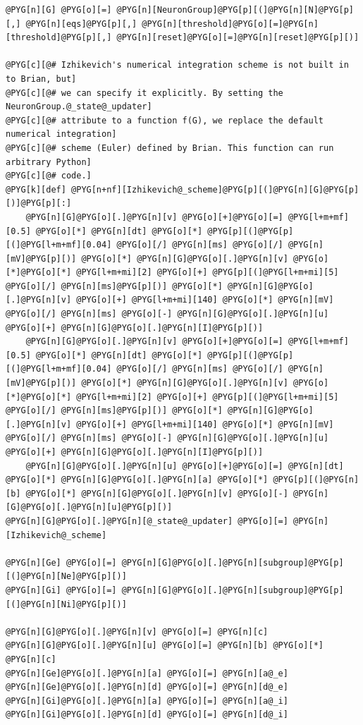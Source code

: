 \documentclass[letterpaper,10pt,english]{manual}
\begin{document}
\begin{Verbatim}[commandchars=@\[\]]
@PYG[n][G] @PYG[o][=] @PYG[n][NeuronGroup]@PYG[p][(]@PYG[n][N]@PYG[p][,] @PYG[n][eqs]@PYG[p][,] @PYG[n][threshold]@PYG[o][=]@PYG[n][threshold]@PYG[p][,] @PYG[n][reset]@PYG[o][=]@PYG[n][reset]@PYG[p][)]

@PYG[c][@# Izhikevich's numerical integration scheme is not built in to Brian, but]
@PYG[c][@# we can specify it explicitly. By setting the NeuronGroup.@_state@_updater]
@PYG[c][@# attribute to a function f(G), we replace the default numerical integration]
@PYG[c][@# scheme (Euler) defined by Brian. This function can run arbitrary Python]
@PYG[c][@# code.]
@PYG[k][def] @PYG[n+nf][Izhikevich@_scheme]@PYG[p][(]@PYG[n][G]@PYG[p][)]@PYG[p][:]
    @PYG[n][G]@PYG[o][.]@PYG[n][v] @PYG[o][+]@PYG[o][=] @PYG[l+m+mf][0.5] @PYG[o][*] @PYG[n][dt] @PYG[o][*] @PYG[p][(]@PYG[p][(]@PYG[l+m+mf][0.04] @PYG[o][/] @PYG[n][ms] @PYG[o][/] @PYG[n][mV]@PYG[p][)] @PYG[o][*] @PYG[n][G]@PYG[o][.]@PYG[n][v] @PYG[o][*]@PYG[o][*] @PYG[l+m+mi][2] @PYG[o][+] @PYG[p][(]@PYG[l+m+mi][5] @PYG[o][/] @PYG[n][ms]@PYG[p][)] @PYG[o][*] @PYG[n][G]@PYG[o][.]@PYG[n][v] @PYG[o][+] @PYG[l+m+mi][140] @PYG[o][*] @PYG[n][mV] @PYG[o][/] @PYG[n][ms] @PYG[o][-] @PYG[n][G]@PYG[o][.]@PYG[n][u] @PYG[o][+] @PYG[n][G]@PYG[o][.]@PYG[n][I]@PYG[p][)]
    @PYG[n][G]@PYG[o][.]@PYG[n][v] @PYG[o][+]@PYG[o][=] @PYG[l+m+mf][0.5] @PYG[o][*] @PYG[n][dt] @PYG[o][*] @PYG[p][(]@PYG[p][(]@PYG[l+m+mf][0.04] @PYG[o][/] @PYG[n][ms] @PYG[o][/] @PYG[n][mV]@PYG[p][)] @PYG[o][*] @PYG[n][G]@PYG[o][.]@PYG[n][v] @PYG[o][*]@PYG[o][*] @PYG[l+m+mi][2] @PYG[o][+] @PYG[p][(]@PYG[l+m+mi][5] @PYG[o][/] @PYG[n][ms]@PYG[p][)] @PYG[o][*] @PYG[n][G]@PYG[o][.]@PYG[n][v] @PYG[o][+] @PYG[l+m+mi][140] @PYG[o][*] @PYG[n][mV] @PYG[o][/] @PYG[n][ms] @PYG[o][-] @PYG[n][G]@PYG[o][.]@PYG[n][u] @PYG[o][+] @PYG[n][G]@PYG[o][.]@PYG[n][I]@PYG[p][)]
    @PYG[n][G]@PYG[o][.]@PYG[n][u] @PYG[o][+]@PYG[o][=] @PYG[n][dt] @PYG[o][*] @PYG[n][G]@PYG[o][.]@PYG[n][a] @PYG[o][*] @PYG[p][(]@PYG[n][b] @PYG[o][*] @PYG[n][G]@PYG[o][.]@PYG[n][v] @PYG[o][-] @PYG[n][G]@PYG[o][.]@PYG[n][u]@PYG[p][)]
@PYG[n][G]@PYG[o][.]@PYG[n][@_state@_updater] @PYG[o][=] @PYG[n][Izhikevich@_scheme]

@PYG[n][Ge] @PYG[o][=] @PYG[n][G]@PYG[o][.]@PYG[n][subgroup]@PYG[p][(]@PYG[n][Ne]@PYG[p][)]
@PYG[n][Gi] @PYG[o][=] @PYG[n][G]@PYG[o][.]@PYG[n][subgroup]@PYG[p][(]@PYG[n][Ni]@PYG[p][)]

@PYG[n][G]@PYG[o][.]@PYG[n][v] @PYG[o][=] @PYG[n][c]
@PYG[n][G]@PYG[o][.]@PYG[n][u] @PYG[o][=] @PYG[n][b] @PYG[o][*] @PYG[n][c]
@PYG[n][Ge]@PYG[o][.]@PYG[n][a] @PYG[o][=] @PYG[n][a@_e]
@PYG[n][Ge]@PYG[o][.]@PYG[n][d] @PYG[o][=] @PYG[n][d@_e]
@PYG[n][Gi]@PYG[o][.]@PYG[n][a] @PYG[o][=] @PYG[n][a@_i]
@PYG[n][Gi]@PYG[o][.]@PYG[n][d] @PYG[o][=] @PYG[n][d@_i]


\end{Verbatim}
\end{document}
